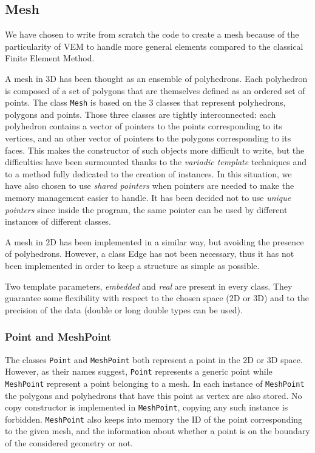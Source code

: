 \subsection{Mesh}
We have chosen to write from scratch the code to create a mesh because of the particularity of VEM to handle more general elements compared to the classical Finite Element Method. 

A mesh in $3$D has been thought as an ensemble of polyhedrons. Each polyhedron is composed of a set of polygons that are themselves defined as an ordered set of points. The class \verb|Mesh| is based on the $3$ classes that represent polyhedrons, polygons and points. Those three classes are tightly interconnected: each polyhedron contains a vector of pointers to the points corresponding to its vertices, and an other vector of pointers to the polygons corresponding to its faces. This makes the constructor of such objects more difficult to write, but the difficulties have been surmounted thanks to the \textit{variadic template} techniques and to a method fully dedicated to the creation of instances. In this situation, we have also chosen to use \textit{shared pointers} when pointers are needed to make the memory management easier to handle. It has been decided not to use \textit{unique pointers} since inside the program, the same pointer can be used by different instances of different classes. 

A mesh in $2$D has been implemented in a similar way, but avoiding the presence of polyhedrons. However, a class Edge has not been necessary, thus it has not been implemented in order to keep a structure as simple as possible. 

Two template parameters, \textit{embedded} and \textit{real} are present in every class. They guarantee some flexibility with respect to the chosen space ($2$D or $3$D) and to the precision of the data (double or long double types can be used). 

\subsubsection{Point and MeshPoint} \label{pts}
The classes \verb|Point| and \verb|MeshPoint| both represent a point in the $2$D or $3$D space. However, as their names suggest, \verb|Point| represents a generic point while \verb|MeshPoint| represent a point belonging to a mesh. In each instance of \verb|MeshPoint| the polygons and polyhedrons that have this point as vertex are also stored. No copy constructor is implemented in \verb|MeshPoint|, copying any such instance is forbidden. \verb|MeshPoint| also keeps into memory the ID of the point corresponding to the given mesh, and the information about whether a point is on the boundary of the considered geometry or not. 

